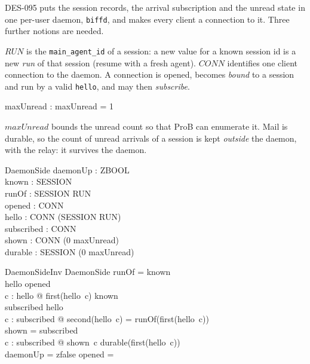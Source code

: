\documentclass[a4paper,10pt,fleqn]{article}
\begin{document}
DES-095 puts the session records, the arrival subscription and the
unread state in one per-user daemon, \texttt{biffd}, and makes every
client a connection to it.  Three further notions are needed.

\begin{zed}
\end{zed}

$RUN$ is the \texttt{main\_agent\_id} of a session: a new value for a
known session id is a new \emph{run} of that session (resume with a
fresh agent).  $CONN$ identifies one client connection to the daemon.
A connection is opened, becomes \emph{bound} to a session and run by a
valid \texttt{hello}, and may then \emph{subscribe}.

\begin{axdef}
  maxUnread : \nat
  \where
  maxUnread = 1
\end{axdef}

$maxUnread$ bounds the unread count so that ProB can enumerate it.  Mail
is durable, so the count of unread arrivals of a session is kept
\emph{outside} the daemon, with the relay: it survives the daemon.

\begin{schema}{DaemonSide}
  daemonUp : ZBOOL \\
  known : \power SESSION \\
  runOf : SESSION \pfun RUN \\
  opened : \power CONN \\
  hello : CONN \pfun (SESSION \cross RUN) \\
  subscribed : \power CONN \\
  shown : CONN \pfun (0 \upto maxUnread) \\
  durable : SESSION \fun (0 \upto maxUnread)
\end{schema}

\begin{schema}{DaemonSideInv}
  DaemonSide
  \where
  \dom runOf = known \\
  \dom hello \subseteq opened \\
  \forall c : \dom hello @ first(hello~c) \in known \\
  subscribed \subseteq \dom hello \\
  \forall c : subscribed @ second(hello~c) = runOf(first(hello~c)) \\
  \dom shown = subscribed \\
  \forall c : subscribed @ shown~c \leq durable(first(hello~c)) \\
  daemonUp = zfalse \implies opened = \emptyset
\end{schema}
\end{document}

